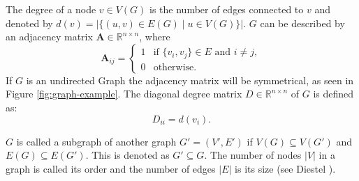 The degree of a node $v \in V(G)$ is the number of edges connected to $v$ and denoted by $d(v) = |\{(u,v) \in E(G) \mid u \in V(G)\}|$. $G$ can be described by an adjacency matrix $\mathbf{A} \in \mathbb{R}^{n \times n}$, where
\begin{equation*}
    \mathbf{A}_{ij}=\begin{cases}
        1 & \text{if } \{v_i,v_j\}\in E \text{ and } i \neq j, \\
        0 & \text{otherwise.}
    \end{cases}
\end{equation*}
If $G$ is an undirected Graph the adjacency matrix will be symmetrical, as seen in Figure \ref{fig:graph-example}.
The diagonal degree matrix $D\in \mathbb{R}^{n\times n}$ of $G$ is defined as:
\begin{equation*}
    D_{ii} = d(v_i).
\end{equation*}

$G$ is called a subgraph of another graph $G'=(V',E')$ if $V(G) \subseteq V(G')$ and $E(G) \subseteq E(G')$. This is denoted as $G' \subseteq G$. The number of nodes $|V|$ in a graph is called its order and the number of edges $|E|$ is its size (see Diestel \cite{Diestel2017}).


